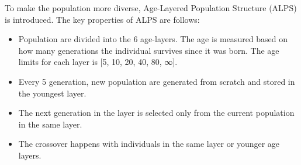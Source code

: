 \documentclass[12pt]{article} %
\begin{document}
To make the population more diverse, Age-Layered Population Structure (ALPS)\cite{Hornby} is introduced. The key properties of ALPS are follows: 
\begin{itemize}
\item Population are divided into the 6 age-layers. The age is measured based on how many generations the individual survives since it was born. The age limits for each layer is [5, 10, 20, 40, 80, ∞]. 
\item Every 5 generation, new population are generated from scratch and stored in the youngest layer. 
\item The next generation in the layer is selected only from the current population in the same layer. 
\item The crossover happens with individuals in the same layer or younger age layers.
\end{itemize}
\end{document}
